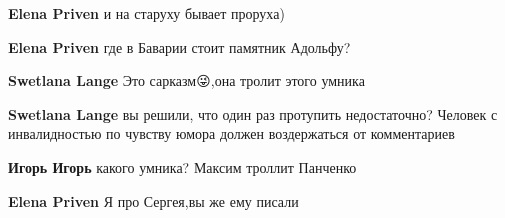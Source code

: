 \begin{itemize}
\begin{itemize}
 
\textbf{Elena Priven} и на старуху бывает проруха)

 
\textbf{Elena Priven} где в Баварии стоит памятник Адольфу?

 
\textbf{Swetlana Lange} Это сарказм😜,она тролит этого умника

 
\textbf{Swetlana Lange} вы решили, что один раз протупить недостаточно? Человек с инвалидностью по чувству юмора должен воздержаться от комментариев

 
\textbf{Игорь Игорь} какого умника? Максим троллит Панченко

 
\textbf{Elena Priven} Я про Сергея,вы же ему писали

 

\end{itemize}
\end{itemize}
